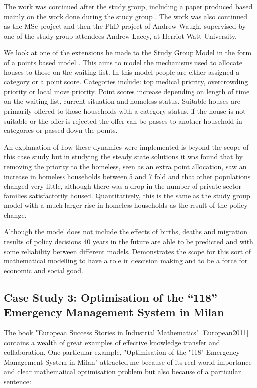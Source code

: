 \documentclass[11pt]{article} %
\begin{document}
	The work was continued after the study group, including a paper produced based mainly on the work done during the study group \cite{Byatt-Smith2003}. The work was also continued as the MSc project and then the PhD project of Andrew Waugh, supervised by one of the study group attendees Andrew Lacey, at Herriot Watt University. 
	
	We look at one of the extensions he made to the Study Group Model in the form of a points based model \cite{Waugh1999}. This aims to model the mechanisms used to allocate houses to those on the waiting list.  In this model people are either assigned a category or a point score. Categories include:  top medical priority, overcrowding priority or local move priority.   Point scores increase depending on length of time on the waiting list, current situation and homeless status. Suitable houses are primarily offered to those households with a category status, if the house is not suitable or the offer is rejected the offer can be passes to another household in categories or passed down the points. 
	
	An explanation of how these dynamics were implemented is beyond the scope of this case study but in studying the steady state solutions it was found that by removing the priority to the homeless, seen as an extra point allocation, saw an increase in homeless households between 5 and 7 fold and that other populations changed very little, although there was a drop in the number of private sector families satisfactorily housed. Quantitatively, this is the same as the study group model with a much larger rise in homeless households as the result of the policy change. 
	
	Although the model does not include the effects of births, deaths and migration results of policy decisions 40 years in the future are able to be predicted and with some reliability between different models. Demonstrates the scope for this sort of mathematical modelling to have a role in descision making and to be a force for economic and social good. 
	
	\subsection{Case Study 3: Optimisation of the “118” Emergency Management System in Milan \label{Milan} }
	The book "European Success Stories in Industrial Mathematics" \ref{European2011} contains a wealth of great examples of effective knowledge transfer and collaboration. One particular example, "Optimisation of the "118" Emergency Management System in Milan" attracted me because of its real-world importance and clear mathematical optimisation problem but also because of a particular sentence: 
	
\end{document}
